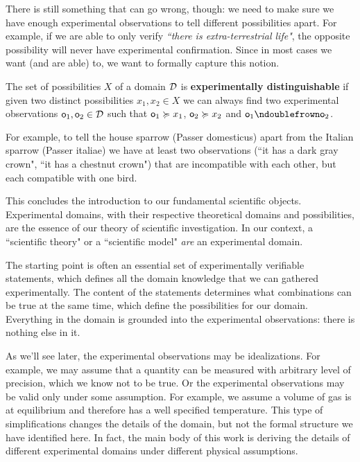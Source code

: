\documentclass[11pt,letterpaper,fleqn]{memoir} %
\begin{document}
There is still something that can go wrong, though: we need to make sure we have enough experimental observations to tell different possibilities apart. For example, if we are able to only verify \emph{``there is extra-terrestrial life"}, the opposite possibility will never have experimental confirmation. Since in most cases we want (and are able) to, we want to formally capture this notion.

\begin{mathSection}
\begin{defn}
	The set of possibilities $X$ of a domain $\mathcal{D}$ is \textbf{experimentally distinguishable} if given two distinct possibilities $x_1, x_2 \in X$ we can always find two experimental observations $\textsf{o}_1, \textsf{o}_2 \in \mathcal{D}$ such that $\textsf{o}_1 \succcurlyeq x_1$, $\textsf{o}_2 \succcurlyeq x_2$ and $\textsf{o}_1 \ncomp \textsf{o}_2$.
\end{defn}
\end{mathSection}

For example, to tell the house sparrow (Passer domesticus) apart from the Italian sparrow (Passer italiae) we have at least two observations (``it has a dark gray crown", ``it has a chestnut crown") that are incompatible with each other, but each compatible with one bird.

This concludes the introduction to our fundamental scientific objects. Experimental domains, with their respective theoretical domains and possibilities, are the essence of our theory of scientific investigation. In our context, a ``scientific theory" or a ``scientific model" \emph{are} an experimental domain.


The starting point is often an essential set of experimentally verifiable statements, which defines all the domain knowledge that we can gathered experimentally. The content of the statements determines what combinations can be true at the same time, which define the possibilities for our domain. Everything in the domain is grounded into the experimental observations: there is nothing else in it.

As we'll see later, the experimental observations may be idealizations. For example, we may assume that a quantity can be measured with arbitrary level of precision, which we know not to be true. Or the experimental observations may be valid only under some assumption. For example, we assume a volume of gas is at equilibrium and therefore has a well specified temperature. This type of simplifications changes the details of the domain, but not the formal structure we have identified here. In fact, the main body of this work is deriving the details of different experimental domains under different physical assumptions.
\end{document}
